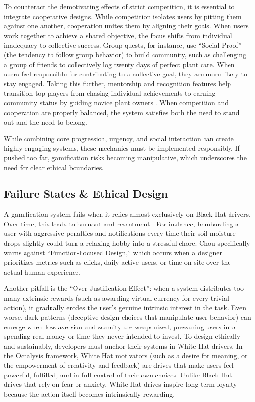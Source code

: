 To counteract the demotivating effects of strict competition, it is essential to integrate cooperative designs. While competition isolates users by pitting them against one another, cooperation unites them by aligning their goals. When users work together to achieve a shared objective, the focus shifts from individual inadequacy to collective success. Group quests, for instance, use ``Social Proof'' (the tendency to follow group behavior) to build community, such as challenging a group of friends to collectively log twenty days of perfect plant care. When users feel responsible for contributing to a collective goal, they are more likely to stay engaged. Taking this further, mentorship and recognition features help transition top players from chasing individual achievements to earning community status by guiding novice plant owners \cite{chouGamification2015}. 
When competition and cooperation are properly balanced, the system satisfies both the need to stand out and the need to belong.
 
While combining core progression, urgency, and social interaction can create highly engaging systems, these mechanics must be implemented responsibly. If pushed too far, gamification risks becoming manipulative, which underscores the need for clear ethical boundaries.

\subsection{Failure States \& Ethical Design}

A gamification system fails when it relies almost exclusively on Black Hat drivers. Over time, this leads to burnout and resentment \cite{chouGamification2015}. For instance, bombarding a user with aggressive penalties and notifications every time their soil moisture drops slightly could turn a relaxing hobby into a stressful chore. Chou specifically warns against ``Function-Focused Design,'' which occurs when a designer prioritizes metrics such as clicks, daily active users, or time-on-site over the actual human experience.

Another pitfall is the ``Over-Justification Effect'': when a system distributes too many extrinsic rewards (such as awarding virtual currency for every trivial action), it gradually erodes the user's genuine intrinsic interest in the task. Even worse, dark patterns (deceptive design choices that manipulate user behavior) can emerge when loss aversion and scarcity are weaponized, pressuring users into spending real money or time they never intended to invest. To design ethically and sustainably, developers must anchor their systems in White Hat drivers. In the Octalysis framework, White Hat motivators (such as a desire for meaning, or the empowerment of creativity and feedback) are drives that make users feel powerful, fulfilled, and in full control of their own choices. Unlike Black Hat drives that rely on fear or anxiety, White Hat drives inspire long-term loyalty because the action itself becomes intrinsically rewarding. 

